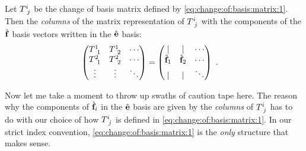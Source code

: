 \documentclass[12pt, oneside]{report}    %
\begin{document}
\begin{newrule}\label{rule:change:of:basis:matrix}
Let $T\aij{i}{j}$ be the change of basis matrix defined by \eqref{eq:change:of:basis:matrix:1}. Then  the \emph{columns} of the matrix representation of $T\aij{i}{j}$ with the components of the $\hat{\mathbf{f}}$ basis vectors written in the $\hat{\mathbf{e}}$ basis:
\begin{align}
    \begin{pmatrix}
        T\aij{1}{1} & T\aij{1}{2} & \cdots \\
        T\aij{2}{1} & T\aij{2}{2} & \cdots \\
        \vdots & \vdots &\ddots  
    \end{pmatrix}
    &
    =
    \begin{pmatrix}
        | & | & \cdots \\
        \bas{f}_1 & \bas{f}_2 & \cdots \\
        | & | & \ddots 
    \end{pmatrix} \ .
\end{align}
\end{newrule}
Now let me take a moment to throw up swaths of caution tape here. The reason why the components of $\hat{\mathbf{f}}_i$ in the $\hat{\mathbf{e}}$ basis are given by the \emph{columns} of $T\aij{i}{j}$ has to do with our choice of how $T\aij{i}{j}$ is defined in \eqref{eq:change:of:basis:matrix:1}. In our strict index convention, \eqref{eq:change:of:basis:matrix:1} is the \emph{only} structure that makes sense. 
\end{document}
